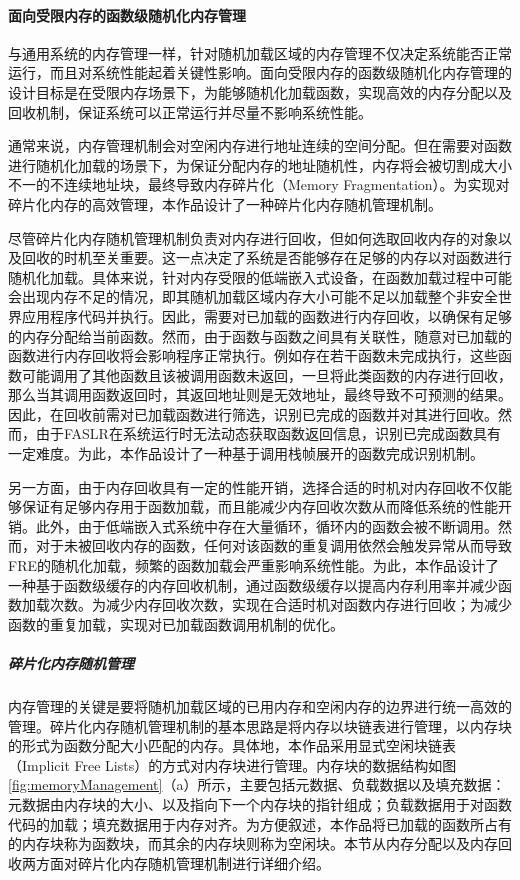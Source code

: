 \documentclass[UTF8,12pt,a4paper,twoside]{ctexart}
\numberwithin{figure}{section}
\begin{document}
\paragraph{面向受限内存的函数级随机化内存管理}
\par 与通用系统的内存管理一样，针对随机加载区域的内存管理不仅决定系统能否正常运行，而且对系统性能起着关键性影响。面向受限内存的函数级随机化内存管理的设计目标是在受限内存场景下，为能够随机化加载函数，实现高效的内存分配以及回收机制，保证系统可以正常运行并尽量不影响系统性能。
\par 通常来说，内存管理机制会对空闲内存进行地址连续的空间分配。但在需要对函数进行随机化加载的场景下，为保证分配内存的地址随机性，内存将会被切割成大小不一的不连续地址块，最终导致内存碎片化（Memory Fragmentation）。为实现对碎片化内存的高效管理，本作品设计了一种碎片化内存随机管理机制。
\par 尽管碎片化内存随机管理机制负责对内存进行回收，但如何选取回收内存的对象以及回收的时机至关重要。这一点决定了系统是否能够存在足够的内存以对函数进行随机化加载。具体来说，针对内存受限的低端嵌入式设备，在函数加载过程中可能会出现内存不足的情况，即其随机加载区域内存大小可能不足以加载整个非安全世界应用程序代码并执行。因此，需要对已加载的函数进行内存回收，以确保有足够的内存分配给当前函数。然而，由于函数与函数之间具有关联性，随意对已加载的函数进行内存回收将会影响程序正常执行。例如存在若干函数未完成执行，这些函数可能调用了其他函数且该被调用函数未返回，一旦将此类函数的内存进行回收，那么当其调用函数返回时，其返回地址则是无效地址，最终导致不可预测的结果。因此，在回收前需对已加载函数进行筛选，识别已完成的函数并对其进行回收。然而，由于FASLR在系统运行时无法动态获取函数返回信息，识别已完成函数具有一定难度。为此，本作品设计了一种基于调用栈帧展开的函数完成识别机制。
\par 另一方面，由于内存回收具有一定的性能开销，选择合适的时机对内存回收不仅能够保证有足够内存用于函数加载，而且能减少内存回收次数从而降低系统的性能开销。此外，由于低端嵌入式系统中存在大量循环，循环内的函数会被不断调用。然而，对于未被回收内存的函数，任何对该函数的重复调用依然会触发异常从而导致FRE的随机化加载，频繁的函数加载会严重影响系统性能。为此，本作品设计了一种基于函数级缓存的内存回收机制，通过函数级缓存以提高内存利用率并减少函数加载次数。为减少内存回收次数，实现在合适时机对函数内存进行回收；为减少函数的重复加载，实现对已加载函数调用机制的优化。
\subparagraph{碎片化内存随机管理}
\par 内存管理的关键是要将随机加载区域的已用内存和空闲内存的边界进行统一高效的管理。碎片化内存随机管理机制的基本思路是将内存以块链表进行管理，以内存块的形式为函数分配大小匹配的内存。具体地，本作品采用显式空闲块链表（Implicit Free Lists）的方式对内存块进行管理。内存块的数据结构如图\ref{fig:memoryManagement}（a）所示，主要包括元数据、负载数据以及填充数据：元数据由内存块的大小、以及指向下一个内存块的指针组成；负载数据用于对函数代码的加载；填充数据用于内存对齐。为方便叙述，本作品将已加载的函数所占有的内存块称为函数块，而其余的内存块则称为空闲块。本节从内存分配以及内存回收两方面对碎片化内存随机管理机制进行详细介绍。
\end{document}
